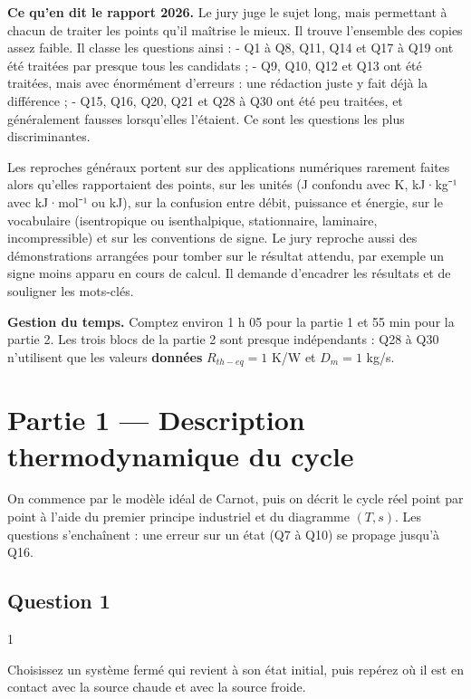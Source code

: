 \documentclass[11pt,a4paper]{article}
\begin{document}
\textbf{Ce qu'en dit le rapport 2026.} Le jury juge le sujet long, mais permettant à chacun de traiter les points qu'il maîtrise le mieux. Il trouve l'ensemble des copies assez faible. Il classe les questions ainsi :
- Q1 à Q8, Q11, Q14 et Q17 à Q19 ont été traitées par presque tous les candidats ;
- Q9, Q10, Q12 et Q13 ont été traitées, mais avec énormément d'erreurs : une rédaction juste y fait déjà la différence ;
- Q15, Q16, Q20, Q21 et Q28 à Q30 ont été peu traitées, et généralement fausses lorsqu'elles l'étaient. Ce sont les questions les plus discriminantes.

Les reproches généraux portent sur des applications numériques rarement faites alors qu'elles rapportaient des points, sur les unités (J confondu avec K, kJ·kg⁻¹ avec kJ·mol⁻¹ ou kJ), sur la confusion entre débit, puissance et énergie, sur le vocabulaire (isentropique ou isenthalpique, stationnaire, laminaire, incompressible) et sur les conventions de signe. Le jury reproche aussi des démonstrations arrangées pour tomber sur le résultat attendu, par exemple un signe moins apparu en cours de calcul. Il demande d'encadrer les résultats et de souligner les mots-clés.

\textbf{Gestion du temps.} Comptez environ 1 h 05 pour la partie 1 et 55 min pour la partie 2. Les trois blocs de la partie 2 sont presque indépendants : Q28 à Q30 n'utilisent que les valeurs \textbf{données} \(R_{th-eq}=1\) K/W et \(D_m=1\) kg/s.

\hypertarget{partie-1-description-thermodynamique-du-cycle}{%
\section{Partie 1 --- Description thermodynamique du cycle}\label{partie-1-description-thermodynamique-du-cycle}}

On commence par le modèle idéal de Carnot, puis on décrit le cycle réel point par point à l'aide du premier principe industriel et du diagramme \((T,s)\). Les questions s'enchaînent : une erreur sur un état (Q7 à Q10) se propage jusqu'à Q16.

\hypertarget{question-1}{%
\subsection{Question 1}\label{question-1}}

\begin{indication}{1}

Choisissez un système fermé qui revient à son état initial, puis repérez où il est en contact avec la source chaude et avec la source froide.

\end{indication}
\end{document}
